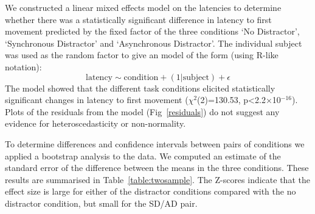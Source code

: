 \documentclass[10pt,letterpaper]{article}
\begin{document}
We constructed a linear mixed effects model on the latencies to
determine whether there was a statistically significant difference in
latency to first movement predicted by the fixed factor of the three
conditions `No Distractor', `Synchronous Distractor' and `Asynchronous
Distractor'. The individual subject was used as the random factor to
give an model of the form (using R-like notation):
\begin{equation}\label{eq:linear_mixed_effects_model}
\text{latency} \sim \text{condition} + (1|\text{subject}) + \epsilon
\end{equation}
%
%
The model showed that the different task conditions elicited
statistically significant changes in latency to first movement
($\chi^2$(2)=130.53, p\textless2.2$\times$10$^{-16}$). Plots of the
residuals from the model (Fig~\ref{residuals}) do not suggest any
evidence for heteroscedasticity or non-normality.

To determine differences and confidence intervals between pairs of
conditions we applied a bootstrap analysis to the data. We computed an
estimate of the standard error of the difference between the means in
the three conditions. These results are summarised in
Table~\ref{table:twosample}. The Z-scores indicate that the effect
size is large for either of the distractor conditions compared with
the no distractor condition, but small for the SD/AD pair.
\end{document}
